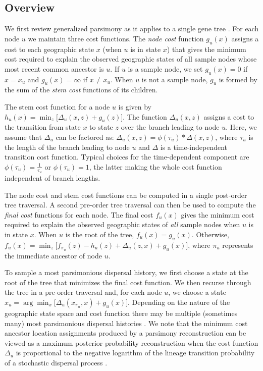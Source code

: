\subsection{Overview}

We first review generalized parsimony as it applies to a single gene tree
\citep{Sankoff_1975, Sankoff_Rousseau_1975}. For each node $u$ we maintain
three cost functions. The \textit{node cost} function $g_u(x)$ assigns a cost 
to each geographic state $x$ (when $u$ is in state $x$) that gives the minimum 
cost required to explain the observed geographic states of all sample nodes 
whose most recent common ancestor is $u$. If $u$ is a sample node, we set 
$g_u(x) = 0$ if $x = x_u$ and $g_u(x) = \infty$ if $x \neq x_u$. When $u$ is 
not a sample node, $g_u$ is formed by the sum of the \textit{stem cost} 
functions of its children.

The stem cost function for a node $u$ is given by
%
$h_u(x) = \min_z \bigl[ \Delta_u(x, z) + g_u(z) \bigr]$.
%
The function $\Delta_u(x, z)$ assigns a cost to the transition from state $x$ to
state $z$ over the branch leading to node $u$. Here, we assume that $\Delta_u$
can be factored as:
%
$\Delta_u(x,z) = \phi(\tau_u) * \Delta(x,z)$,
%
where $\tau_u$ is the length of the branch leading to node $u$ and $\Delta$ is
a time-independent transition cost function. Typical choices for the
time-dependent component are $\phi(\tau_u) = \frac{1}{\tau_u}$ or 
$\phi(\tau_u) = 1$, the latter making the whole cost function independent of
branch lengths.

The node cost and stem cost functions can be computed in a single post-order
tree traversal. A second pre-order tree traversal can then be used to compute
the \textit{final cost} functions for each node. The final cost $f_u(x)$
gives the minimum cost required to explain the observed geographic states of
\emph{all} sample nodes when $u$ is in state $x$. When $u$ is the root of the
tree, $f_u(x) = g_u(x)$. Otherwise, 
%
$f_u(x) = \min_z \bigl[ f_{\pi_u}(z) - h_u(z) + \Delta_u(z,x) + g_u(x) \bigr]$,
%
where $\pi_u$ represents the immediate ancestor of node $u$.

To sample a most parsimonious dispersal history, we first choose a state at the
root of the tree that minimizes the final cost function. We then recurse through 
the tree in a pre-order traversal and, for each node $u$, we choose a state
$x_u = \arg\min_x \bigl[\Delta_u(x_{\pi_u}, x) + g_u(x)\bigr]$. Depending on the
nature of the geographic state space and cost function there may be multiple
(sometimes many) most parsimonious dispersal histories . We note that the 
minimum cost ancestor location assignments produced by a parsimony 
reconstruction can be viewed as a maximum posterior probability reconstruction 
when the cost function $\Delta_u$ is proportional to the negative logarithm of 
the lineage transition probability of a stochastic dispersal process 
\citep{Maddison_1991}.

